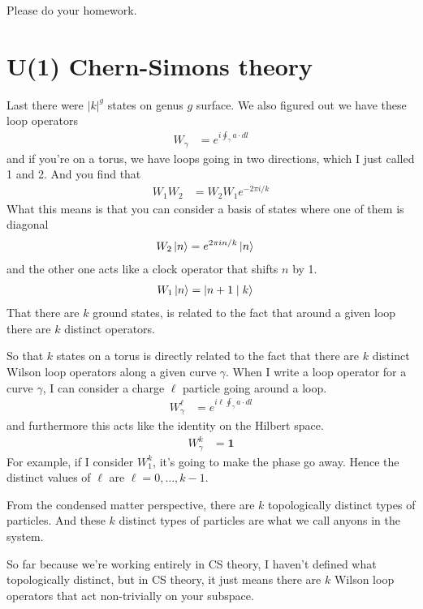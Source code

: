 Please do your homework.
\section{U(1) Chern-Simons theory}
Last there were $|k|^g$ states on genus $g$ surface.
We also figured out we have these loop operators
\begin{align}
    W_\gamma
    &=
    e^{i\oint_\gamma a\cdot dl}
\end{align}
and if you're on a torus,
we have loops going in two directions,
which I just called 1 and 2.
And you find that
\begin{align}
    W_1 W_2 &=
    W_2 W_1 e^{-2\pi i/k}
\end{align}
What this means is that you can consider a basis of states where one of them is
diagonal
\begin{align}
    W_2 \ket{n}
    &=
    e^{2\pi in/k} \ket{n}
\end{align}
and the other one acts like a clock operator that shifts $n$ by 1.
\begin{align}
    W_1\ket{n}
    &=
    \ket{n + 1\mid k}
\end{align}
That there are $k$ ground states,
is related to the fact that around a given loop there are $k$ distinct
operators.

So that $k$ states on a torus is directly related to the fact that there are $k$
distinct Wilson loop operators along a given curve $\gamma$.
When I write a loop operator for a curve $\gamma$,
I can consider a charge $\ell$ particle going around a loop.
\begin{align}
    W_\gamma^{\ell}
    &=
    e^{i\ell \oint_\gamma a\cdot dl}
\end{align}
and furthermore this acts like the identity on the Hilbert space.
\begin{align}
    W_\gamma^k &= \mathbf{1}
\end{align}
For example, if I consider $W_1^k$,
it's going to make the phase go away.
Hence the distinct values of $\ell$ are $\ell=0,\ldots, k-1$.

From the condensed matter perspective,
there are $k$ topologically distinct types of particles.
And these $k$ distinct types of particles are what we call anyons in the system.

So far because we're working entirely in CS theory,
I haven't defined what topologically distinct,
but in CS theory,
it just means there are $k$ Wilson loop operators that act non-trivially on your
subspace.

